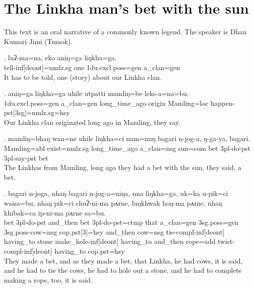 ﻿%


\section*{The Linkha man's bet with the sun} 

\noindent This text is an oral narrative of a commonly known legend. The speaker is Dhan Kumari Jimi (Tumok).

\setcounter{ExNo}{0}

\exg. luʔ-ma=na, eko aniŋ=ga liŋkha=ga.\\
tell{\sc -inf[deont]=nmlz.sg} one {\sc 1du.excl.poss=gen} a\_clan{\sc=gen}\\
It has to be told, one (story) about our Linkha clan.


\exg. aniŋ=ga liŋkha=ga uhile utpatti mamliŋ=be leks-a=na=bu.\\
{\sc 1du.excl.poss=gen} a\_clan{\sc =gen} long\_time\_ago origin Mamling{\sc =loc} happen{\sc -pst[3sg]=nmlz.sg=hsy}\\
Our Linkha clan originated long ago in Mamling, they say.


\exg. mamliŋ=bhaŋ wan=ne uhile liŋkha=ci nam=nuŋ bagari n-jog-a, ŋ-ga-ya, bagari.\\
Mamling{\sc =abl} exist{\sc [3sg]=nmlz.sg} long\_time\_ago a\_clan{\sc =nsg} {\sc sun=com} bet {\sc 3pl-}do{\sc -pst} {\sc 3pl-}say{\sc -pst} bet\\
The Linkhas from Mamling, long ago they had a bet with the sun, they said, a bet.


\exg. bagari n-joga, nhaŋ bagari n-jog-a=niŋa, nna liŋkha=ga, uk=ka u-pik=ci waisa=bu, nhaŋ pik=ci chuʔ-ni-ma pʌrne, luŋkhwak hoŋ-ma pʌrne, nhaŋ khibak=ca ip-ni-ma pʌrne sa=bu.\\
bet {\sc 3pl-}do{\sc -pst} and\_then bet {\sc 3pl-}do{\sc -pst=ctmp} that a\_clan{\sc =gen} {\sc 3sg.poss=gen} {\sc 3sg.poss-}cow{\sc =nsg} {\sc cop.pst[3]=hsy} and\_then cow{\sc =nsg} tie{\sc -compl-inf[deont]} having\_to stone make\_hole{\sc -inf[deont]} having\_to and\_then rope{\sc =add} twist{\sc -compl-inf[deont]} having\_to {\sc cop.pst=hsy}\\
They made a bet, and as they made a bet, that Linkha, he had cows, it is said, and he had to tie the cows, he had to hole out a stone, and he had to complete making a rope, too, it is said.


